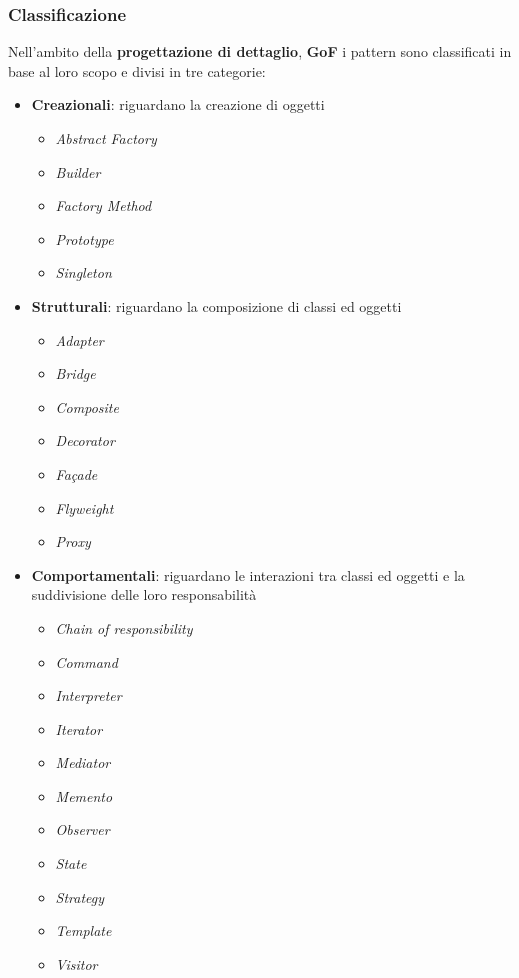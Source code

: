 \subsubsection{Classificazione}
Nell'ambito della \textbf{progettazione di dettaglio}, \textbf{GoF} i pattern sono classificati in base al loro scopo e divisi in tre categorie:
\begin{itemize}
	\item \textbf{Creazionali}: riguardano la creazione di oggetti
	\begin{itemize}
		\item \textit{Abstract Factory}
		\item \textit{Builder}
		\item \textit{Factory Method}
		\item \textit{Prototype}
		\item \textit{Singleton}
	\end{itemize}
	\item \textbf{Strutturali}: riguardano la composizione di classi ed oggetti
	\begin{itemize}
		\item \textit{Adapter}
		\item \textit{Bridge}
		\item \textit{Composite}
		\item \textit{Decorator}
		\item \textit{Façade}
		\item \textit{Flyweight}
		\item \textit{Proxy}
	\end{itemize}
	\item \textbf{Comportamentali}: riguardano le interazioni tra classi ed oggetti e la suddivisione delle loro responsabilità
	\begin{itemize}
		\item \textit{Chain of responsibility}
		\item \textit{Command}
		\item \textit{Interpreter}
		\item \textit{Iterator}
		\item \textit{Mediator}
		\item \textit{Memento}
		\item \textit{Observer}
		\item \textit{State}
		\item \textit{Strategy}
		\item \textit{Template}
		\item \textit{Visitor}
	\end{itemize}
\end{itemize}

